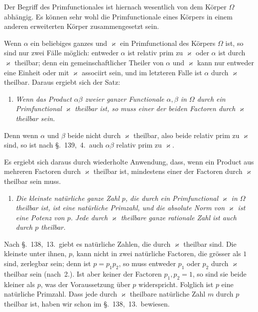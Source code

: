\documentclass[12pt,a4paper]{article}
\theoremstyle{definition}
\begin{document}
Der Begriff des Primfunctionales ist hiernach wesentlich von dem Körper $\Omega$ abhängig. Es können sehr wohl die Primfunctionale eines Körpers in einem anderen erweiterten Körper zusammengesetzt sein.

Wenn $\alpha$ ein beliebiges ganzes und $\varkappa$ ein Primfunctional des Körpers $\Omega$ ist, so sind nur zwei Fälle möglich: entweder $\alpha$ ist relativ prim zu $\varkappa$ oder $\alpha$ ist durch $\varkappa$ theilbar; denn ein gemeinschaftlicher Theiler von $\alpha$ und $\varkappa$ kann nur entweder eine Einheit oder mit $\varkappa$ associirt sein, und im letzteren Falle ist $\alpha$ durch $\varkappa$ theilbar. Daraus ergiebt sich der Satz:

\begin{enumerate}[label=\arabic*., resume]
\item \textit{Wenn das Product $\alpha\beta$ zweier ganzer Functionale $\alpha,\beta$ in $\Omega$ durch ein Primfunctional $\varkappa$ theilbar ist, so muss einer der beiden Factoren durch $\varkappa$ theilbar sein.}
\end{enumerate}

Denn wenn $\alpha$ und $\beta$ beide nicht durch $\varkappa$ theilbar, also beide relativ prim zu $\varkappa$ sind, so ist nach \S.~139,~4.\ auch $\alpha\beta$ relativ prim zu $\varkappa$.

Es ergiebt sich daraus durch wiederholte Anwendung, dass, wenn ein Product aus mehreren Factoren durch $\varkappa$ theilbar ist, mindestens einer der Factoren durch $\varkappa$ theilbar sein muss.

\begin{enumerate}[label=\arabic*., resume]
\item \textit{Die kleinste natürliche ganze Zahl $p$, die durch ein Primfunctional $\varkappa$ in $\Omega$ theilbar ist, ist eine natürliche Primzahl, und die absolute Norm von $\varkappa$ ist eine Potenz von $p$. Jede durch $\varkappa$ theilbare ganze rationale Zahl ist auch durch $p$ theilbar.}
\end{enumerate}

Nach \S.~138,~13.\ giebt es natürliche Zahlen, die durch $\varkappa$ theilbar sind. Die kleinste unter ihnen, $p$, kann nicht in zwei natürliche Factoren, die grösser als $1$ sind, zerlegbar sein; denn ist $p=p_1p_2$, so muss entweder $p_1$ oder $p_2$ durch $\varkappa$ theilbar sein (nach~2.). Ist aber keiner der Factoren $p_1,p_2=1$, so sind sie beide kleiner als $p$, was der Voraussetzung über $p$ widerspricht. Folglich ist $p$ eine natürliche Primzahl. Dass jede durch $\varkappa$ theilbare natürliche Zahl $m$ durch $p$ theilbar ist, haben wir schon im \S.~138,~13.\ bewiesen.
\end{document}
